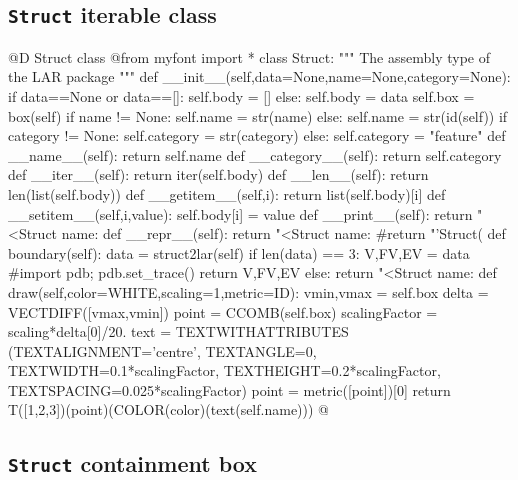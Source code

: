 \documentclass[11pt,oneside]{article}    %
\begin{document}
\subsection{\texttt{Struct} iterable class}
@D Struct class
@{from myfont import *
class Struct:
    """ The assembly type of the LAR package """
    def __init__(self,data=None,name=None,category=None):
        if data==None or data==[]:
            self.body = []
        else:
            self.body = data
            self.box = box(self) 
        if name != None: 
            self.name = str(name)
        else:
            self.name = str(id(self))
        if category != None: 
            self.category = str(category)
        else:
            self.category = "feature"
    def __name__(self):
        return self.name
    def __category__(self):
        return self.category
    def __iter__(self):
        return iter(self.body)
    def __len__(self):
        return len(list(self.body))
    def __getitem__(self,i):
        return list(self.body)[i]
    def __setitem__(self,i,value):
        self.body[i] = value
    def __print__(self): 
        return "<Struct name: %
    def __repr__(self):
        return "<Struct name: %
        #return "'Struct(%
    def boundary(self):
        data = struct2lar(self)
        if len(data) == 3:
            V,FV,EV = data
            #import pdb; pdb.set_trace()
            return V,FV,EV
        else:
            return "<Struct name: %
    def draw(self,color=WHITE,scaling=1,metric=ID):
        vmin,vmax = self.box
        delta = VECTDIFF([vmax,vmin])
        point = CCOMB(self.box)
        scalingFactor = scaling*delta[0]/20.
        text = TEXTWITHATTRIBUTES (TEXTALIGNMENT='centre', TEXTANGLE=0,
                    TEXTWIDTH=0.1*scalingFactor, 
                    TEXTHEIGHT=0.2*scalingFactor,
                    TEXTSPACING=0.025*scalingFactor)
        point = metric([point])[0]
        return T([1,2,3])(point)(COLOR(color)(text(self.name)))
@}


\subsection{\texttt{Struct} containment box}
\end{document}

